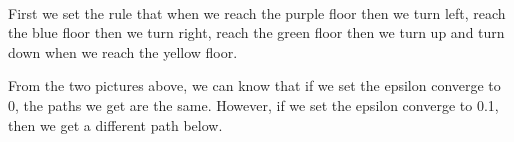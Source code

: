 \documentclass[aps,letterpaper,10pt]{revtex4}
\begin{document}
\\First we set the rule that when we reach the purple floor then we turn left, reach the blue floor then we turn right, reach the green floor then we turn up and turn down when we reach the yellow floor.
\begin{figure}[H]
\centering
	 

	  \label{fig:oscil}
	\end{figure}
From the two pictures above, we can know that if we set the epsilon converge to 0, the paths we get are the same. However, if we set the epsilon converge to 0.1, then we get a different path below.
\begin{figure}[H]
	  \centering
	   
	  \label{fig:oscil}
	\end{figure}
\end{document}

